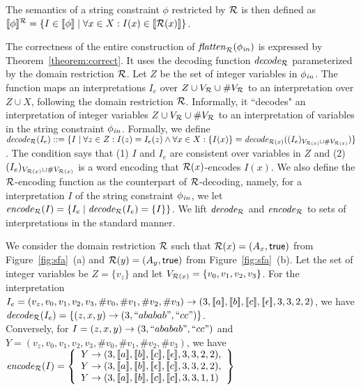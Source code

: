 \documentclass[sigplan,review,anonymous]{acmart}\settopmatter{printfolios=true,printccs=false,printacmref=false}
\begin{document}

The semantics of a string constraint $\phi$ restricted by $\mathcal{R}$ is then defined as 
$[\![\phi]\!]^{\mathcal{R}} = \{I\in[\![\phi]\!] \mid \forall x\in X:I(x)\in[\![\mathcal{R}(x)]\!]\}$.

The correctness of the entire construction of $\mathit{flatten}_{\mathcal{R}}(\phi_{\mathit{in}})$ is expressed by  Theorem~\ref{theorem:correct}. 
It uses the decoding function $\mathit{decode_{\mathcal{R}}}$ parameterized by the domain restriction $\mathcal{R}$. 
Let $Z$ be the set of integer variables in $\phi_{\mathit{in}}$.
The function maps an interpretations $I_e$ over $Z\cup V_{\mathcal{R}}\cup\#V_{\mathcal{R}}$
to an interpretation over $Z \cup X$, following the domain restriction $\mathcal{R}$. Informally, it ``decodes" an interpretation of integer variables $Z\cup V_{\mathcal{R}}\cup\#V_{\mathcal{R}}$ to an interpretation of variables in the string constraint $\phi_{\mathit{in}}$. Formally,
we define $\mathit{decode_{\mathcal{R}}} (I_e) ::= \{I \mid \forall z\in Z: I(z) = I_e(z) \wedge\forall x\in X: \{I(x)\} = \mathit{decode_{\mathcal{R}(x)}} ((I_e)_{V_{\mathcal{R}(x)}\cup \#V_{\mathcal{R}(x)}})\}$.
The condition says that (1) $I$ and $I_e$ are consistent over variables in $Z$ and (2) $(I_e)_{V_{\mathcal{R}(x)}\cup \#V_{\mathcal{R}(x)}}$ is a word encoding that $\mathcal{R}(x)$-encodes $I(x)$.
We also define the $\mathcal{R}$-encoding function as the counterpart of $\mathcal{R}$-decoding,  
%
namely, for a interpretation $I$ of the string constraint $\phi_{\mathit{in}}$,  
we let $\mathit{encode}_{\mathcal{R}} (I) =\{I_e\mid \mathit{decode_{\mathcal{R}}} (I_e) = \{I\} \}$.
We lift $\mathit{decode_{\mathcal{R}}}$ and $\mathit{encode}_{\mathcal{R}}$ to sets of interpretations in the standard manner.
\begin{example}
We consider the domain restriction $\mathcal{R}$ such that $\mathcal{R}(x)	 =(A_x,\mbox{$\mathsf{true}$})$ from Figure~\ref{fig:sfa}~(a) and $\mathcal{R}(y) = (A_y,\mbox{$\mathsf{true}$})$ from Figure~\ref{fig:sfa}~(b). 
Let the set of integer variables be $Z=\{v_z\}$ and let $V_{\mathcal{R}(x)} =\{v_0, v_1,v_2,v_3\}$. 
For the interpretation $I_e =(v_z,v_0,v_1,v_2,v_3,\#v_0,\#v_1,\#v_2,\#v_3) \rightarrow (3,\semof{a}, \semof{b}, \semof{c},\semof{\epsilon},3,3,2,2)$, we have $\mathit{decode_{\mathcal{R}}} (I_e) = \{(z,x,y) \rightarrow(3, ``ababab",``cc") \}$.\\ 
Conversely, for $I=(z,x,y) \rightarrow(3, ``ababab",``cc")$ and $Y=(v_z,v_0,v_1,v_2,v_3,\#v_0,\#v_1,\#v_2,\#v_3)$, we have $\encode \dr (I) =\left\{ 
\begin{array}{l}
Y \rightarrow (3,\semof{a}, \semof{b}, \semof{c},\semof{\epsilon},3,3,2,2), \\
Y \rightarrow (3,\semof{a}, \semof{b},\semof{\epsilon}, \semof{c},3,3,2,2), \\
Y\rightarrow (3,\semof{a}, \semof{b},\semof{c},\semof{c},3,3,1,1)
\end{array}
 \right\}$
\end{example}
\end{document}
